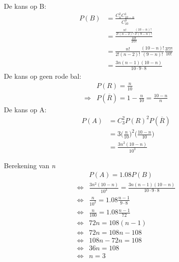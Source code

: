 \documentclass[12pt]{report}
\begin{document}
\begin{itemize}[label={}, leftmargin=*]
{{	De kans op B:
	\begin{equation*}
	 \begin{split}
	  P(B) & = \frac{C_{n}^{2}C_{10 - n}^{1}}{C_{10}^{3}} \\
	       & = \frac{\frac{n!}{2!(n-2)!}\frac{(10-n)!}{1!(9-n)!}}{\frac{10!}{3!7!}} \\
	       & = \frac{n!}{2!(n-2)!}\frac{(10-n)!}{(9-n)!}\frac{3!7!}{10!} \\
	       & = \frac{3n(n-1)(10-n)}{10\cdot9\cdot8}
	 \end{split}
	\end{equation*}
	De kans op geen rode bal:
	\begin{equation*}
	 \begin{split}
	  & P(R) = \frac{n}{10} \\
	  \Rightarrow&  P(\overline{R}) = 1 - \frac{n}{10} = \frac{10 - n}{n} 
	 \end{split}
	\end{equation*}
	De kans op A:
	\begin{equation*}
	 \begin{split}
	  P(A) & = C_3^2P(R)^2P(\overline{R}) \\
	  & = 3\bigg(\frac{n}{10}\bigg)^2\bigg(\frac{10 - n}{10}\bigg) \\
	  & = \frac{3n^2(10 - n)}{10^3}
	 \end{split}
	\end{equation*}

	Berekening van \textit{n}
	\begin{equation*}
	 \begin{split}
	  & P(A) = 1.08P(B) \\
	  \Leftrightarrow & \frac{3n^2(10 - n)}{10^3} = \frac{3n(n-1)(10-n)}{10\cdot9\cdot8} \\
	  \Leftrightarrow & \frac{n}{10^2} = 1.08\frac{n - 1}{9\cdot 8} \\
	  \Leftrightarrow & \frac{n}{100} = 1.08\frac{n - 1}{72} \\
	  \Leftrightarrow & 72n = 108(n-1)\\
	  \Leftrightarrow & 72n = 108n - 108 \\
	  \Leftrightarrow & 108n - 72n = 108 \\
	  \Leftrightarrow & 36n = 108 \\
	  \Leftrightarrow & n = 3
	 \end{split}
	\end{equation*}

	  }
	
	
	}
\end{itemize}
\end{document}
